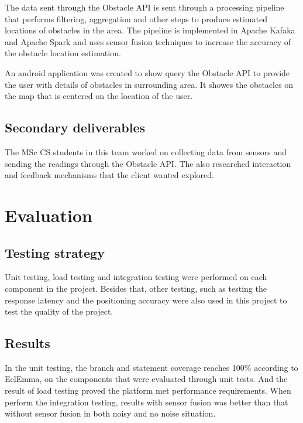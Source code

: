 \documentclass[prodmode,acmtosem]{acmsmall} %
\begin{document}
The data sent through the Obstacle API is sent through a processing pipeline that performs filtering, aggregation and other steps to produce estimated locations of obstacles in the area. The pipeline is implemented in Apache Kafaka and Apache Spark and uses sensor fusion techniques to increase the accuracy of the obstacle location estimation. 

An android application was created to show query the Obstacle API to provide the user with details of obstacles in surrounding area. It showes the obstacles on the map that is centered on the location of the user.

\subsection{Secondary deliverables}
The MSc CS students in this team worked on collecting data from sensors and sending the readings through the Obstacle API. The also researched interaction and feedback mechanisms that the client wanted explored.

\section{Evaluation}
\subsection{Testing strategy}
Unit testing, load testing and integration testing were performed on each component in the project. Besides that, other testing, such as testing the response latency and the positioning accuracy were also used in this project to test the quality of the project.
\subsection{Results}
In the unit testing, the branch and statement coverage reaches 100\% according to EclEmma, on the components that were evaluated through unit tests. And the result of load testing proved the platform met performance requirements. When perform the integration testing, results with sensor fusion was better than that without sensor fusion in both noisy and no noise situation.
\end{document}
